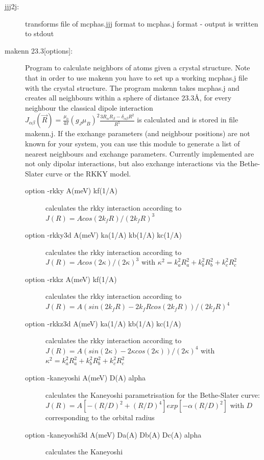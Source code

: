 \begin{description}
\item [\prg jjj2j:] transforms file of {\prg mcphas.jjj} format to {\prg %
mcphas.j} format
- output is written to stdout

\item[\prg makenn 23.3{[options]}:] Program to calculate neighbors of atoms given a crystal structure.
Note that in order to use {\prg makenn} you have to set up a 
working {\prg mcphas.j} file with the crystal structure. 
The program {\prg makenn} takes {\prg mcphas.j} and
creates all neighbours within a sphere of distance 23.3\AA, for every neighbour the classical
dipole interaction $J_{\alpha\beta}(\vec R)=\frac{\mu_0}{4\pi} (g_J \mu_B)^2 \frac{3R_{\alpha}R_{\beta}-\delta_{\alpha\beta}R^2}{R^5}$
 is calculated and is stored in file {\prg makenn.j}. If the exchange %
parameters 
(and neighbour positions) are not known for your system, you can use this module 
to generate a list of nearest neighbours and exchange parameters. Currently implemented 
 are not only dipolar interactions, but also exchange interactions via the Bethe-Slater 
curve or the RKKY model. 
\begin{description}
\item[option {\prg -rkky A(meV) kf(1/A)}] calculates the rkky interaction according to $J(R)=A %
cos(2 k_f R)/(2 k_f R)^3$
\item[option {\prg -rkky3d A(meV) ka(1/A) kb(1/A) kc(1/A)}] calculates the rkky interaction %
according to $J(R)=A cos(2 \kappa)/(2 \kappa)^3$ with $\kappa^2=k_a^2 R_a^2 + k_b^2 R_b^2 + %
k_c^2 R_c^2$
\item[option {\prg -rkkz A(meV) kf(1/A)}] calculates the rkky interaction according to $J(R)=A %
(sin(2 k_f R)- 2 k_f R cos(2 k_f R))/(2 k_f R)^4$
\item[option {\prg -rkkz3d A(meV) ka(1/A) kb(1/A) kc(1/A)}] calculates the rkky interaction %
according to $J(R)=A (sin(2 \kappa)- 2 \kappa cos(2 \kappa))/(2 \kappa)^4$ with $\kappa^2=k_a^2 %
R_a^2 + k_b^2 R_b^2 + k_c^2 R_c^2$
\item[option {\prg -kaneyoshi A(meV) D(A) alpha}] calculates the Kaneyoshi parametrisation for %
the Bethe-Slater
                               curve: $J(R)= A [-(R/D)^2+(R/D)^4]exp[-\alpha (R/D)^2]$  with $D$ %
corresponding
                               to the orbital radius
\item[option {\prg -kaneyoshi3d A(meV) Da(A) Db(A) Dc(A) alpha}] calculates the Kaneyoshi %

\end{description}
\end{description}

